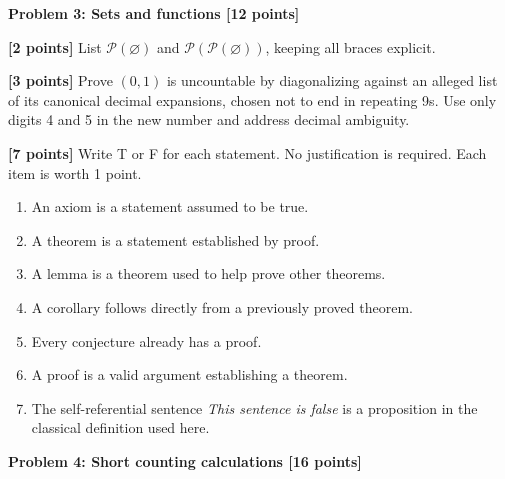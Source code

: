 \documentclass[12pt,letterpaper]{article}
\newcommand{\problemheading}[2][5\baselineskip]{\Needspace{#1}\par\noindent\hspace*{-0.625in}\textbf{#2}\par\nobreak\vspace{0.3em}}
\newcommand{\examspace}[1]{\par\vspace*{#1cm}}
\begin{document}
\clearpage
\vspace*{0.21in}
\problemheading{Problem 3: Sets and functions [12 points]}
\begin{list}{}{\setlength{\leftmargin}{0.25in}\setlength{\rightmargin}{0.25in}}\item[]
\begin{description}[font=\normalfont,leftmargin=1.2em,labelsep=0.4em]
\item[(a)] \textbf{[2 points]} List $\mathcal P(\varnothing)$ and $\mathcal P(\mathcal P(\varnothing))$, keeping all braces explicit.
\examspace{3}
\Needspace{\dimexpr 5cm+4\baselineskip\relax}
\item[(b)] \textbf{[3 points]} Prove $(0,1)$ is uncountable by diagonalizing against an alleged list of its canonical decimal expansions, chosen not to end in repeating 9s. Use only digits 4 and 5 in the new number and address decimal ambiguity.
\examspace{5}
\Needspace{\dimexpr 1cm+4\baselineskip\relax}
\item[(c)] \textbf{[7 points]} Write T or F for each statement. No justification is required. Each item is worth 1 point.\begin{enumerate}[label=(\roman*)]\item An axiom is a statement assumed to be true.\item A theorem is a statement established by proof.\item A lemma is a theorem used to help prove other theorems.\item A corollary follows directly from a previously proved theorem.\item Every conjecture already has a proof.\item A proof is a valid argument establishing a theorem.\item The self-referential sentence \emph{This sentence is false} is a proposition in the classical definition used here.\end{enumerate}
\examspace{1}
\end{description}
\end{list}
\clearpage
\vspace*{0.21in}
\problemheading{Problem 4: Short counting calculations [16 points]}
\end{document}
